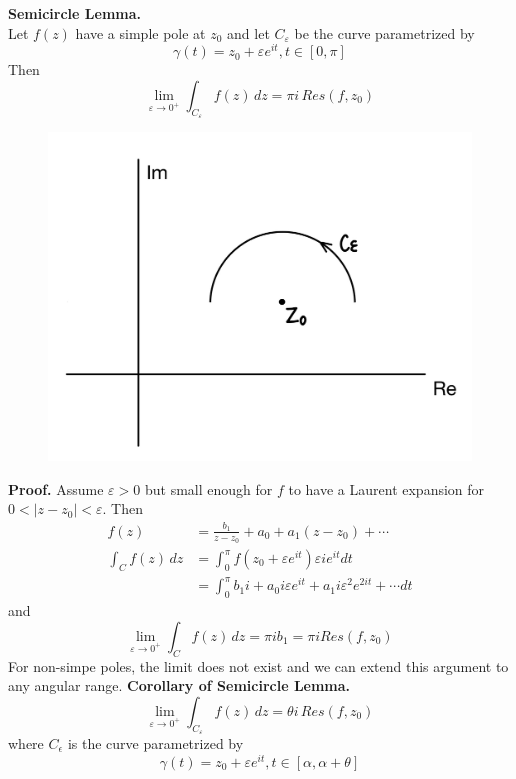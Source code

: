 \documentclass[11pt]{article}
\begin{document}
\newline
\textbf{Semicircle Lemma.} \\
Let $f(z)$ have a simple pole at $z_0$ and let $C_\varepsilon$ be the curve parametrized by 
$$ \gamma(t) = z_0 + \varepsilon e^{it}, t \in [0, \pi]$$
Then 
$$ \lim_{\varepsilon \to 0^+} \int_{C_\varepsilon}f(z) \, dz = \pi i \, Res(f, z_0)$$
\begin{figure}[h]
\includegraphics[scale=0.17]{21_4} 
\centering
\end{figure} 
\newline
\textbf{Proof.} Assume $\varepsilon > 0$ but small enough for $f$ to have a Laurent expansion for $0 < |z - z_0| < \varepsilon$. Then 
\begin{align*}
f(z) &= \frac{b_1}{z - z_0} + a_0 + a_1(z - z_0)+ \cdots \\
\int_Cf(z)\,dz &= \int_0^\pi f(z_0 + \varepsilon e^{it})\varepsilon i e^{it }dt \\ 
&= \int_0^\pi b_1i + a_0i\varepsilon e^{it} + a_1i\varepsilon^2e^{2it}+ \cdots dt
\end{align*}
and 
$$\lim_{\varepsilon \to 0^+}\int_C{f(z)}\, dz = \pi i b_1 = \pi i Res(f, z_0)$$
For non-simpe poles, the limit does not exist and we can extend this argument to any angular range.
\newpage
\textbf{Corollary of Semicircle Lemma.} \\
$$\lim_{\varepsilon \to 0^+} \int_{C_\varepsilon}f(z) \, dz = \theta i \, Res(f, z_0)$$
where $C_\epsilon$ is the curve parametrized by 
$$ \gamma(t) = z_0 + \varepsilon e^{it}, t \in [\alpha, \alpha + \theta] $$ 
\newline
\end{document}
